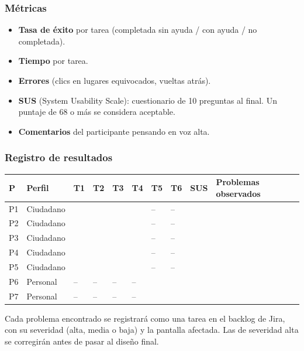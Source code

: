 \documentclass[11pt,a4paper]{article}
\begin{document}
\subsubsection*{Métricas}

\begin{itemize}
  \item \textbf{Tasa de éxito} por tarea (completada sin ayuda / con ayuda / no completada).
  \item \textbf{Tiempo} por tarea.
  \item \textbf{Errores} (clics en lugares equivocados, vueltas atrás).
  \item \textbf{SUS} (System Usability Scale): cuestionario de 10 preguntas al final. Un puntaje de 68 o más se considera aceptable.
  \item \textbf{Comentarios} del participante pensando en voz alta.
\end{itemize}

\subsubsection*{Registro de resultados}

{\small
\begin{center}
\begin{tabular}{C{1cm} L{1.7cm} *{6}{C{0.75cm}} C{0.9cm} L{4.2cm}}
\toprule
\textbf{P} & \textbf{Perfil} & \textbf{T1} & \textbf{T2} & \textbf{T3} & \textbf{T4} & \textbf{T5} & \textbf{T6} & \textbf{SUS} & \textbf{Problemas observados} \\
\midrule
P1 & Ciudadano & & & & & -- & -- & & \\
P2 & Ciudadano & & & & & -- & -- & & \\
P3 & Ciudadano & & & & & -- & -- & & \\
P4 & Ciudadano & & & & & -- & -- & & \\
P5 & Ciudadano & & & & & -- & -- & & \\
P6 & Personal & -- & -- & -- & -- & & & & \\
P7 & Personal & -- & -- & -- & -- & & & & \\
\bottomrule
\end{tabular}
\end{center}
}

Cada problema encontrado se registrará como una tarea en el backlog de Jira, con su severidad (alta, media o baja) y la pantalla afectada. Las de severidad alta se corregirán antes de pasar al diseño final.
\end{document}
